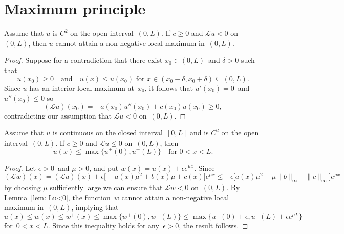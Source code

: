 \section{Maximum principle}

\begin{lemma}\label{lem: Lu<0}
Assume that $u$ is $C^2$ on the open interval~$(0,L)$.
If $c\ge0$ and $\mathcal{L}u<0$ on~$(0,L)$, then $u$ cannot attain a 
non-negative local maximum in~$(0,L)$.
\end{lemma}
\begin{proof}
Suppose for a contradiction that there exist $x_0\in(0,L)$~and $\delta>0$ such
that
\[
u(x_0)\ge0\quad\text{and}\quad
\text{$u(x)\le u(x_0)$ for~$x\in(x_0-\delta,x_0+\delta)\subseteq(0,L)$.}
\]
Since $u$ has an interior local maximum at~$x_0$, it follows that 
$u'(x_0)=0$~and $u''(x_0)\le0$ so 
\[
(\mathcal{L}u)(x_0)=-a(x_0)u''(x_0)+c(x_0)u(x_0)\ge 0,
\]
contradicting our assumption that $\mathcal{L}u<0$ on~$(0,L)$.
\end{proof}

\begin{theorem}\label{thm: max principle 1d}
Assume that $u$ is continuous on the closed interval~$[0,L]$ and is $C^2$ on 
the open interval~$(0,L)$. If $c\ge0$ and $\mathcal{L}u\le0$ on~$(0,L)$, then
\[
u(x)\le\max\{u^+(0),u^+(L)\}\quad\text{for $0<x<L$.}
\]
\end{theorem}
\begin{proof}
Let $\epsilon>0$~and $\mu>0$, and put $w(x)=u(x)+\epsilon e^{\mu x}$.  Since
\[
(\mathcal{L}w)(x)
	=(\mathcal{L}u)(x)+\epsilon\bigl[-a(x)\mu^2+b(x)\mu+c(x)\bigr]e^{\mu x}
	\le-\epsilon\bigl[a(x)\mu^2-\mu\|b\|_\infty-\|c\|_\infty\bigr]e^{\mu x}
\]
by choosing $\mu$ sufficiently large we can ensure that $\mathcal{L}w<0$
on~$(0,L)$.  By Lemma~\ref{lem: Lu<0}, the function~$w$ cannot attain a 
non-negative local maximum in~$(0,L)$, implying that 
\[
u(x)\le w(x)\le w^+(x)\le\max\{w^+(0),w^+(L)\}
	\le\max\{u^+(0)+\epsilon,u^+(L)+\epsilon e^{\mu L}\}
\]
for~$0<x<L$.  Since this inequality holds for any~$\epsilon>0$, the result 
follows.
\end{proof}

